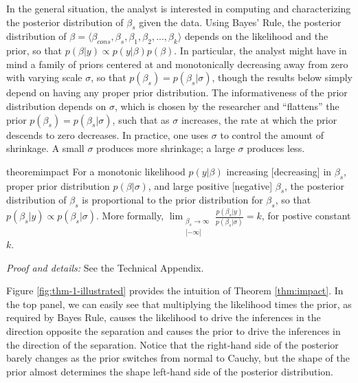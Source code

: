 \documentclass[12pt]{article}
\begin{document}
In the general situation, the analyst is interested in computing and characterizing the posterior distribution of $\beta_s$ given the data. 
Using Bayes' Rule, the posterior distribution of $\beta = \langle \beta_{cons}, \beta_{s}, \beta_1, \beta_2, ..., \beta_k \rangle$ depends on the likelihood and the prior, so that $p(\beta | y) \propto p(y|\beta)p(\beta)$. 
In particular, the analyst might have in mind a family of priors centered at and monotonically decreasing away from zero with varying scale $\sigma$, so that $p(\beta_s) = p(\beta_s | \sigma)$, though the results below simply depend on having any proper prior distribution. 
The informativeness of the prior distribution depends on $\sigma$, which is chosen by the researcher and ``flattens'' the prior $p(\beta_s) = p(\beta_s | \sigma)$, such that as $\sigma$ increases, the rate at which the prior descends to zero decreases. In practice, one uses $\sigma$ to control the amount of shrinkage. A small $\sigma$ produces more shrinkage; a large $\sigma$ produces less.

\begin{restatable}{theorem}{impact}\label{thm:impact}
For a monotonic likelihood $p(y | \beta)$ increasing [decreasing] in $\beta_s$, proper prior distribution $p(\beta | \sigma)$, and large positive [negative] $\beta_s$, the posterior distribution of $\beta_s$ is proportional to the prior distribution for $\beta_s$, so that $p(\beta_s | y) \propto p(\beta_s | \sigma)$. 
More formally, $\displaystyle \lim _{\substack{\beta_s \to \infty\\ \lbrack -\infty \rbrack}} \frac{p(\beta_s | y)}{p(\beta_s | \sigma)} = k$, for postive constant $k$.
\end{restatable}

\noindent \textit{Proof and details:} See the Technical Appendix.

Figure \ref{fig:thm-1-illustrated} provides the intuition of Theorem \ref{thm:impact}. In the top panel, we can easily see that multiplying the likelihood times the prior, as required by Bayes Rule, causes the likelihood to drive the inferences in the direction opposite the separation and causes the prior to drive the inferences in the direction of the separation. Notice that the right-hand side of the posterior barely changes as the prior switches from normal to Cauchy, but the shape of the prior almost determines the shape left-hand side of the posterior distribution.
\end{document}

